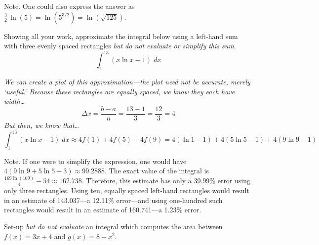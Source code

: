 \documentclass[12pt,letterpaper]{exam}
\begin{document}
\begin{questions}
{Note. One could also express the answer as $\frac{3}{2} \, \ln(5)= \ln(5^{3/2})= \ln(\sqrt{125})$.
}



\newpage
\question[15] Showing all your work, approximate the integral below using a left-hand sum with three evenly spaced rectangles \textit{but do not evaluate or simplify this sum}.
	\[
	\int_1^{13} \left( x \ln x - 1 \right) \;dx
	\] \pspace

{\itshape \tsol We can create a plot of this approximation---the plot need not be accurate, merely `useful.' Because these rectangles are equally spaced, we know they each have width\dots
	\[
	\Delta x= \dfrac{b - a}{n}= \dfrac{13 - 1}{3}= \dfrac{12}{3}= 4
	\]
But then, we know that\dots
	\[
	\int_1^{13} \left( x \ln x - 1 \right) \;dx \approx 4 f(1) + 4f(5) + 4f(9)= 4 (\ln 1 - 1) + 4 (5 \ln 5 - 1) + 4 (9 \ln 9 - 1)
	\] \vfill

{\scriptsize Note. If one were to simplify the expression, one would have $4(9 \ln 9 + 5 \ln 5 - 3) \approx 99.2888$. The exact value of the integral is $\frac{169 \ln(169)}{4} - 54 \approx 162.738$. Therefore, this estimate has only a 39.99\% error using only three rectangles. Using ten, equally spaced left-hand rectangles would result in an estimate of 143.037---a 12.11\% error---and using one-hundred such rectangles would result in an estimate of 160.741---a 1.23\% error.}
}



\newpage
\question[10] Set-up \textit{but do not evaluate} an integral which computes the area between $f(x)= 3x + 4$ and $g(x)= 8 - x^2$. \pspace


\end{questions}
\end{document}
